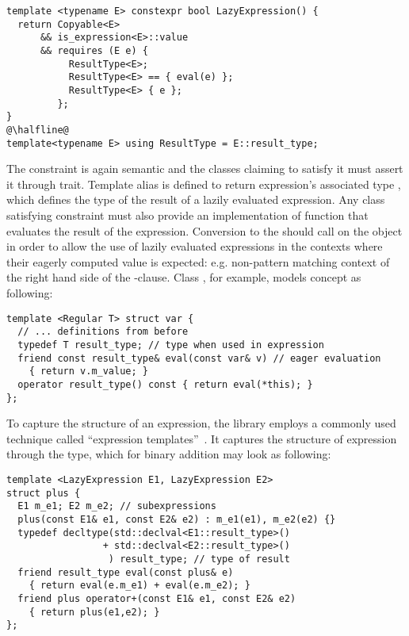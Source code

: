 \begin{lstlisting}
template <typename E> constexpr bool LazyExpression() {
  return Copyable<E> 
      && is_expression<E>::value
      && requires (E e) {
           ResultType<E>;
           ResultType<E> == { eval(e) };
           ResultType<E> { e };
         };
}
@\halfline@
template<typename E> using ResultType = E::result_type;
\end{lstlisting}

\noindent
The constraint is again semantic and the classes claiming to satisfy it must 
assert it through  trait. Template alias  
is defined to return expression's associated type , which 
defines the type of the result of a lazily evaluated expression. Any class 
satisfying  constraint must also provide an implementation 
of function  that evaluates the result of the expression. Conversion 
to the  should call  on the object in order to 
allow the use of lazily evaluated expressions in the contexts where their 
eagerly computed value is expected: e.g. non-pattern matching context of the 
right hand side of the -clause. Class , for example, 
models concept  as following:

\begin{lstlisting}
template <Regular T> struct var {
  // ... definitions from before
  typedef T result_type; // type when used in expression
  friend const result_type& eval(const var& v) // eager evaluation
    { return v.m_value; }
  operator result_type() const { return eval(*this); }
};
\end{lstlisting}

\noindent
To capture the structure of an expression, the library employs a commonly used 
technique called ``expression templates''~\cite{Veldhuizen95expressiontemplates, 
vandevoorde2003c++}. It captures the structure of expression through the type, 
which for binary addition may look as following:

\begin{lstlisting}[keepspaces,columns=flexible]
template <LazyExpression E1, LazyExpression E2>
struct plus {
  E1 m_e1; E2 m_e2; // subexpressions
  plus(const E1& e1, const E2& e2) : m_e1(e1), m_e2(e2) {}
  typedef decltype(std::declval<E1::result_type>() 
                 + std::declval<E2::result_type>()
                  ) result_type; // type of result
  friend result_type eval(const plus& e) 
    { return eval(e.m_e1) + eval(e.m_e2); }
  friend plus operator+(const E1& e1, const E2& e2) 
    { return plus(e1,e2); }
};
\end{lstlisting}

